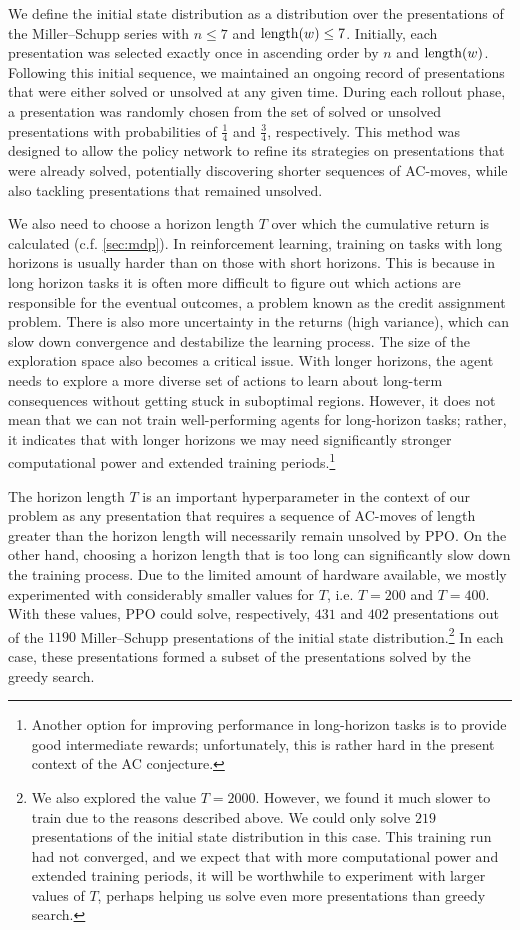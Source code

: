 We define the initial state distribution as a distribution over the presentations of the Miller--Schupp series with $n \leq 7$ and $\operatorname{length}(w) \leq 7$. Initially, each presentation was selected exactly once in ascending order by $n$ and $\operatorname{length}(w)$. Following this initial sequence, we maintained an ongoing record of presentations that were either solved or unsolved at any given time. During each rollout phase, a presentation was randomly chosen from the set of solved or unsolved presentations with probabilities of $\frac{1}{4}$ and $\frac{3}{4}$, respectively. This method was designed to allow the policy network to refine its strategies on presentations that were already solved, potentially discovering shorter sequences of AC-moves, while also tackling presentations that remained unsolved.

We also need to choose a horizon length $T$ over which the cumulative return is calculated (c.f. \autoref{sec:mdp}). In reinforcement learning, training on tasks with long horizons is usually harder than on those with short horizons. This is because in long horizon tasks it is often more difficult to figure out which actions are responsible for the eventual outcomes, a problem known as the credit assignment problem. There is also more uncertainty in the returns (high variance), which can slow down convergence and destabilize the learning process. The size of the exploration space also becomes a critical issue. With longer horizons, the agent needs to explore a more diverse set of actions to learn about long-term consequences without getting stuck in suboptimal regions. However, it does not mean that we can not train well-performing agents for long-horizon tasks; rather, it indicates that with longer horizons we may need significantly stronger computational power and extended training periods.\footnote{Another option for improving performance in long-horizon tasks is to provide good intermediate rewards; unfortunately, this is rather hard in the present context of the AC conjecture.}

The horizon length $T$ is an important hyperparameter in the context of our problem as any presentation that requires a sequence of AC-moves of length greater than the horizon length will necessarily remain unsolved by PPO. On the other hand, choosing a horizon length that is too long can significantly slow down the training process. Due to the limited amount of hardware available, we mostly experimented with considerably smaller values for $T$, i.e. $T=200$ and $T=400$. With these values, PPO could solve, respectively, $431$ and $402$ presentations out of the $1190$ Miller--Schupp presentations of the initial state distribution.\footnote{We also explored the value $T=2000$. However, we found it much slower to train due to the reasons described above. We could only solve $219$ presentations of the initial state distribution in this case. This training run had not converged, and we expect that with more computational power and extended training periods, it will be worthwhile to experiment with larger values of $T$, perhaps helping us solve even more presentations than greedy search.}
In each case, these presentations formed a subset of the presentations solved by the greedy search.

